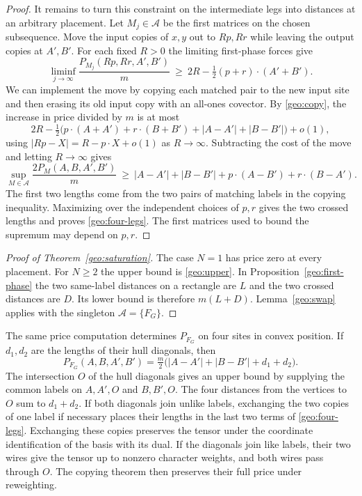 \begin{proof}
It remains to turn this constraint on the intermediate legs into
distances at an arbitrary placement. Let $M_j\in\mathcal A$ be the
first matrices on the chosen subsequence. Move the input copies of $x,y$
out to $Rp,Rr$ while leaving the output copies at $A',B'$. For each
fixed $R>0$ the limiting first-phase forces give
\[
 \liminf_{j\to\infty}\frac{P_{M_j}(Rp,Rr,A',B')}{m}
       \ \ge\ 2R-\tfrac12(p+r)\cdot(A'+B').
\]
We can implement the move by copying each matched pair to the new
input site and then erasing its old input copy with an all-ones
covector. By \eqref{geo:copy}, the increase in price divided by $m$
is at most
\[
 2R-\tfrac12\bigl(p\cdot(A+A')+r\cdot(B+B')+
                         |A-A'|+|B-B'|\bigr)+o(1),
\]
using $|Rp-X|=R-p\cdot X+o(1)$ as $R\to\infty$. Subtracting the
cost of the move and letting $R\to\infty$ gives
\[
 \sup_{M\in\mathcal A}\frac{2P_M(A,B,A',B')}{m}
 \ \ge\ |A-A'|+|B-B'|+p\cdot(A-B')+r\cdot(B-A').
\]
The first two lengths come from the two pairs of matching labels in
the copying inequality. Maximizing over the independent choices of
$p,r$ gives the two crossed lengths and proves \eqref{geo:four-legs}.
The first matrices used to bound the supremum may depend on $p,r$.
\end{proof}

\begin{proof}[Proof of Theorem~\ref{geo:saturation}]
The case $N=1$ has price zero at every placement. For $N\ge2$ the
upper bound is \eqref{geo:upper}. In Proposition~\ref{geo:first-phase}
the two same-label distances on a rectangle are $L$ and the two
crossed distances are $D$. Its lower bound is therefore $m(L+D)$.
Lemma~\ref{geo:swap} applies with the singleton $\mathcal A=\{F_G\}$.
\end{proof}

\begin{remark}\label{geo:quadrilateral}
The same price computation determines $P_{F_G}$ on four sites in
convex position. If $d_1,d_2$ are the lengths of their hull diagonals,
then
\[
 P_{F_G}(A,B,A',B')
   =\tfrac m2\bigl(|A-A'|+|B-B'|+d_1+d_2\bigr).
\]
The intersection $O$ of the hull diagonals gives an upper bound by
supplying the common labels on $A,A',O$ and $B,B',O$. The four
distances from the vertices to $O$ sum to $d_1+d_2$.
If both diagonals join unlike labels, exchanging the two copies of
one label if necessary places their lengths in the last two terms
of \eqref{geo:four-legs}. Exchanging these copies preserves the tensor
under the coordinate identification of the basis with its dual.
If the diagonals join like labels, their two wires give the tensor
up to nonzero character weights, and both wires pass through $O$.
The copying theorem then preserves their full price under reweighting.
\end{remark}

